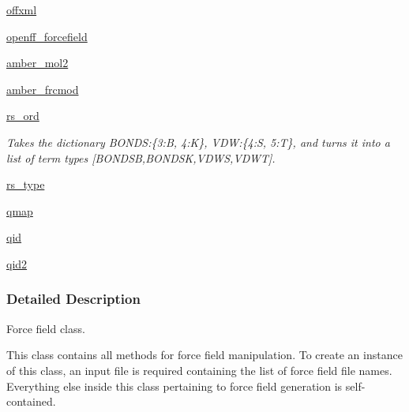\begin{DoxyCompactItemize}
\item 
\hyperlink{classsrc_1_1forcefield_1_1FF_aac5cf1cd3192cb37332cf3f362a48c2b}{offxml}
\item 
\hyperlink{classsrc_1_1forcefield_1_1FF_acf9add4c12d7584b019dc37e3e297434}{openff\+\_\+forcefield}
\item 
\hyperlink{classsrc_1_1forcefield_1_1FF_af2876f467d9177f890e58b2aca3df6c1}{amber\+\_\+mol2}
\item 
\hyperlink{classsrc_1_1forcefield_1_1FF_ae0fe43ae2fe92b78e39ba0591b3e577c}{amber\+\_\+frcmod}
\item 
\hyperlink{classsrc_1_1forcefield_1_1FF_ae85c97bc7b6ebb1a6139f3fcde701ad9}{rs\+\_\+ord}
\begin{DoxyCompactList}\small\item\em Takes the dictionary \textquotesingle{}B\+O\+N\+DS\textquotesingle{}\+:\{3\+:\textquotesingle{}B\textquotesingle{}, 4\+:\textquotesingle{}K\textquotesingle{}\}, \textquotesingle{}V\+DW\textquotesingle{}\+:\{4\+:\textquotesingle{}S\textquotesingle{}, 5\+:\textquotesingle{}T\textquotesingle{}\}, and turns it into a list of term types \mbox{[}\textquotesingle{}B\+O\+N\+D\+SB\textquotesingle{},\textquotesingle{}B\+O\+N\+D\+SK\textquotesingle{},\textquotesingle{}V\+D\+WS\textquotesingle{},\textquotesingle{}V\+D\+WT\textquotesingle{}\mbox{]}. \end{DoxyCompactList}\item 
\hyperlink{classsrc_1_1forcefield_1_1FF_a91ce04e723c001379987020019c15725}{rs\+\_\+type}
\item 
\hyperlink{classsrc_1_1forcefield_1_1FF_a12b2d68b7aafd6cdde7bed411e0c82b2}{qmap}
\item 
\hyperlink{classsrc_1_1forcefield_1_1FF_abf657eda67115fcc5e60b30d8992144f}{qid}
\item 
\hyperlink{classsrc_1_1forcefield_1_1FF_a9fff6f83b578f45e47c4c1fd563fe470}{qid2}
\end{DoxyCompactItemize}


\subsubsection{Detailed Description}
Force field class. 

This class contains all methods for force field manipulation. To create an instance of this class, an input file is required containing the list of force field file names. Everything else inside this class pertaining to force field generation is self-\/contained.

